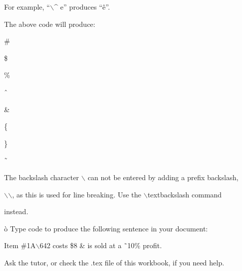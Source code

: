 \documentclass[a4paper,portrait,12pt]{article}
\begin{document}
\begin{flushleft}
For example, {``}\ensuremath{\backslash}\^{} e'' produces {``}ê''.
\end{flushleft}


\begin{flushleft}
The above code will produce:
\end{flushleft}


\#





\$





\%





ˆ





\&





\{





\}





˜





\begin{flushleft}
The backslash character \ensuremath{\backslash} can not be entered by adding a prefix backslash,
\end{flushleft}


\begin{flushleft}
\ensuremath{\backslash}\ensuremath{\backslash}, as this is used for line breaking. Use the \ensuremath{\backslash}textbackslash command
\end{flushleft}


\begin{flushleft}
instead.
\end{flushleft}


\begin{flushleft}
\`{o} Type code to produce the following sentence in your document:
\end{flushleft}


\begin{flushleft}
Item \#1A\ensuremath{\backslash}642 costs \$8 \& is sold at a ˜10\% profit.
\end{flushleft}


\begin{flushleft}
Ask the tutor, or check the .tex file of this workbook, if you need help.
\end{flushleft}
\end{document}
